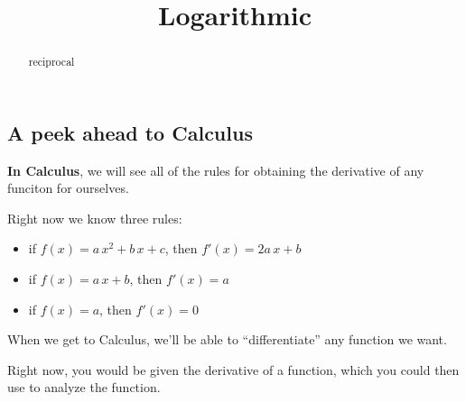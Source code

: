 \documentclass{ximera}
\title{Logarithmic}
\begin{document}
\begin{abstract}
reciprocal
\end{abstract}
\maketitle











\subsection*{A peek ahead to Calculus}





\textbf{\textcolor{blue!55!black}{In Calculus}}, we will see all of the rules for obtaining the derivative of any funciton for ourselves. 

Right now we know three rules:

\begin{itemize}
	\item if $f(x) = a \, x^2 + b \, x + c$, then $f'(x) = 2a \, x + b$
	\item if $f(x) = a \, x + b$, then $f'(x) = a$
	\item if $f(x) = a$, then $f'(x) = 0$
\end{itemize}



When we get to Calculus, we'll be able to ``differentiate'' any function we want. 

Right now, you would be given the derivative of a function, which you could then use to analyze the function. 
\end{document}
